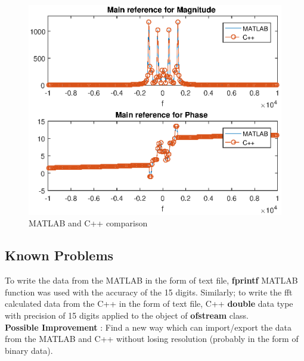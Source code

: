\begin{figure}[h]
	\centering
	\includegraphics[width=12cm]{./algorithms/fft/figures/mixed_signal_fft.eps}
	\caption{MATLAB and C++ comparison}\label{mixed_signal_fft}
\end{figure}

\subsection{Known Problems}
To write the data from the MATLAB in the form of text file, \textbf{fprintf} MATLAB function was used with the accuracy of the 15 digits. Similarly; to write the fft calculated data from the C++ in the form of text file, C++ \textbf{double} data type with precision of 15 digits applied to the object of \textbf{ofstream} class.\\
\textbf{Possible Improvement} : Find a new way which can import/export the data from the MATLAB and C++ without losing resolution (probably in the form of binary data).



\newpage

\renewcommand{\bibname}{References}
%
%
%
%
%

\cleardoublepage


